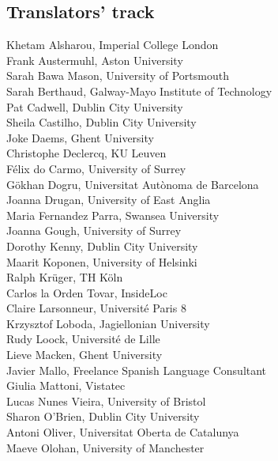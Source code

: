 \documentclass[a4paper,11pt,twoside]{book}
\begin{document}
\clearpage

\subsection*{Translators' track}
\noindent Khetam Alsharou, Imperial College London\\
\noindent Frank Austermuhl, Aston University\\
\noindent Sarah Bawa Mason, University of Portsmouth\\
\noindent Sarah Berthaud, Galway-Mayo Institute of Technology\\
\noindent Pat Cadwell, Dublin City University\\
\noindent Sheila Castilho, Dublin City University\\
\noindent Joke Daems, Ghent University\\
\noindent Christophe Declercq, KU Leuven\\
\noindent Félix do Carmo, University of Surrey\\
\noindent Gökhan Dogru, Universitat Autònoma de Barcelona\\
\noindent Joanna Drugan, University of East Anglia\\
\noindent Maria Fernandez Parra, Swansea University\\
\noindent Joanna Gough, University of Surrey\\
\noindent Dorothy Kenny, Dublin City University\\
\noindent Maarit Koponen, University of Helsinki\\
\noindent Ralph Krüger, TH Köln\\
\noindent Carlos la Orden Tovar, InsideLoc\\
\noindent Claire Larsonneur, Université Paris 8\\
\noindent Krzysztof Loboda, Jagiellonian University\\
\noindent Rudy Loock, Université de Lille\\
\noindent Lieve Macken, Ghent University\\
\noindent Javier Mallo, Freelance Spanish Language Consultant\\
\noindent Giulia Mattoni, Vistatec\\
\noindent Lucas Nunes Vieira, University of Bristol\\
\noindent Sharon O'Brien, Dublin City University\\
\noindent Antoni Oliver, Universitat Oberta de Catalunya\\
\noindent Maeve	Olohan, University of Manchester\\
\end{document}
